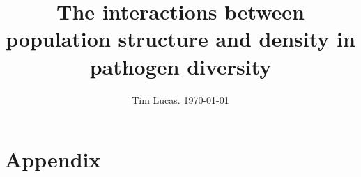 \documentclass[a4paper,10pt,reqno]{amsart}
\begin{document}
\title{The interactions between population structure and density in pathogen diversity}
\author{Tim Lucas. \today}
\date{}

\maketitle





\clearpage
\appendix
\section{Appendix}






\small
\printbibliography 
\end{document}
